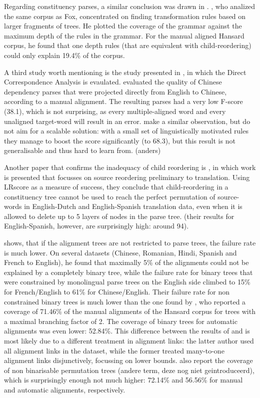 \documentclass{report}
\theoremstyle{definition}
\theoremstyle{plain}
\begin{document}
Regarding constituency parses, a similar conclusion was drawn in \cite{galley2004s}. \citeauthor{galley2004s}, who analized the same corpus as Fox, concentrated on finding transformation rules based on larger fragments of trees. He plotted the coverage of the grammar against the maximum depth of the rules in the grammar. For the manual aligned Hansard corpus, he found that one depth rules (that are equivalent with child-reordering) could only explain 19.4\% of the corpus.

A third study worth mentioning is the study presented in \cite{hwa2002evaluating}, in which the Direct Correspondence Analysis is evaulated. \citeauthor{hwa2002evaluating} evaluated the quality of Chinese dependency parses that were projected directly from English to Chinese, according to a manual alignment. The resulting parses had a very low F-score (38.1), which is not surprising, as every multiple-aligned word and every unaligned target-word will result in an error. \citeauthor{hwa2002evaluating} make a similar observation, but do not aim for a scalable solution: with a small set of linguistically motivated rules they manage to boost the score significantly (to 68.3), but this result is not generalisable and thus hard to learn from. (anders)

Another paper that confirms the inadequacy of child reordering is \cite{khalilov2012statistical}, in which work is presented that focusses on source reordering preliminary to translation. Using LRscore \citep{birch2010lrscore} as a measure of success, they conclude that child-reordering in a constituency tree cannot be used to reach the perfect permutation of source-words in English-Dutch and English-Spanish translation data, even when it is allowed to delete up to 5 layers of nodes in the parse tree. (their results for English-Spanish, however, are surprisingly high: around 94). 

\citeauthor{wellington2006empirical} shows, that if the alignment trees are not restricted to parse trees, the failure rate is much lower. On several datasets (Chinese, Romanian, Hindi, Spanish and French to English), he found that maximally 5\% of the alignments could not be explained by a completely binary tree, while the failure rate for binary trees that were constrained by monolingual parse trees on the English side climbed to 15\% for French/English to 61\% for Chinese/English. Their failure rate for non constrained binary trees is much lower than the one found by \cite{simaan2013hats}, who reported a coverage of 71.46\% of the manual alignments of the Hansard corpus for trees with a maximal branching factor of 2. The coverage of binary trees for automatic alignments was even lower: 52.84\%. This difference between the results of \cite{wellington2006empirical} and \cite{simaan2013hats} is most likely due to a different treatment in alignment links: the latter author used all alignment links in the dataset, while the former treated many-to-one alignment links disjunctively, focussing on lower bounds. \cite{simaan2013hats} also report the coverage of non binarisable permutation trees (andere term, deze nog niet geintroduceerd), which is surprisingly enough not much higher: 72.14\% and 56.56\% for manual and automatic alignments, respectively.
\end{document}
